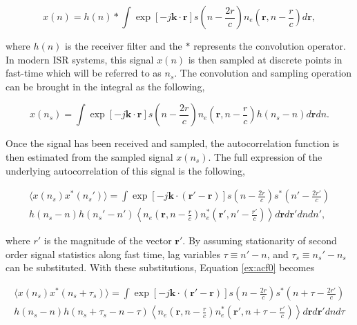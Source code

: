 \begin{equation}
\label{eq:xt}
x(n) = h(n) \ast \int \exp\left[-j\mathbf{k} \cdot \mathbf{r}\right]  s\left(n-\frac{2r}{c}\right) n_e\left(\mathbf{r},n-\frac{r}{c}\right) d\mathbf{r},
\end{equation}

\noindent where $h(n)$ is the receiver filter and the $\ast$ represents the convolution operator. In modern ISR systems, this signal $x(n)$ is then sampled at discrete points in fast-time which will be referred to as $n_s$. The convolution and sampling operation can be brought in the integral as the following,

\begin{equation}
\label{ex:xtaug}
x(n_s) = \int \exp\left[-j\mathbf{k} \cdot \mathbf{r}\right]  s\left(n-\frac{2r}{c}\right) n_e\left(\mathbf{r},n-\frac{r}{c}\right)h(n_s-n) d\mathbf{r}dn.
\end{equation}


Once the signal has been received and sampled, the autocorrelation function is then estimated from the sampled signal $x(n_s)$. The full expression of the underlying autocorrelation of this signal is the following, 

\begin{multline}
\label{ex:acf0}
\langle x(n_s)x^*(n_s')\rangle =  \int \exp\left[-j \mathbf{k}\cdot \left(\mathbf{r}'-\mathbf{r} \right)\right]s\left(n-\frac{2r}{c}\right)s^*\left(n'-\frac{2r'}{c}\right) \\ h(n_s-n)h(n_s'-n')\left\langle n_e\left(\mathbf{r},n-\frac{r}{c}\right)n^*_e\left(\mathbf{r}',n'-\frac{r'}{c}\right)\right\rangle d\mathbf{r} d\mathbf{r}'dn dn',
\end{multline}

\noindent where $r'$ is the magnitude of the vector $\mathbf{r}'$. By assuming stationarity of second order signal statistics along fast time, lag variables $\tau\equiv n'-n$, and $\tau_s\equiv n_s'-n_s$ can be substituted. With these substitutions, Equation \ref{ex:acf0} becomes


\begin{multline}
\label{ex:acf1}
\langle x(n_s)x^*(n_s+\tau_s)\rangle =\int \exp\left[-j \mathbf{k}\cdot \left(\mathbf{r}'-\mathbf{r} \right)\right]s\left(n-\frac{2r}{c}\right)s^*\left(n+\tau-\frac{2r'}{c}\right) \\ h(n_s-n)h(n_s+\tau_s-n-\tau) \left\langle n_e\left(\mathbf{r},n-\frac{r}{c}\right)n^*_e\left(\mathbf{r}',n+\tau-\frac{r'}{c}\right)\right\rangle d\mathbf{r} d\mathbf{r}' dnd\tau
\end{multline}

